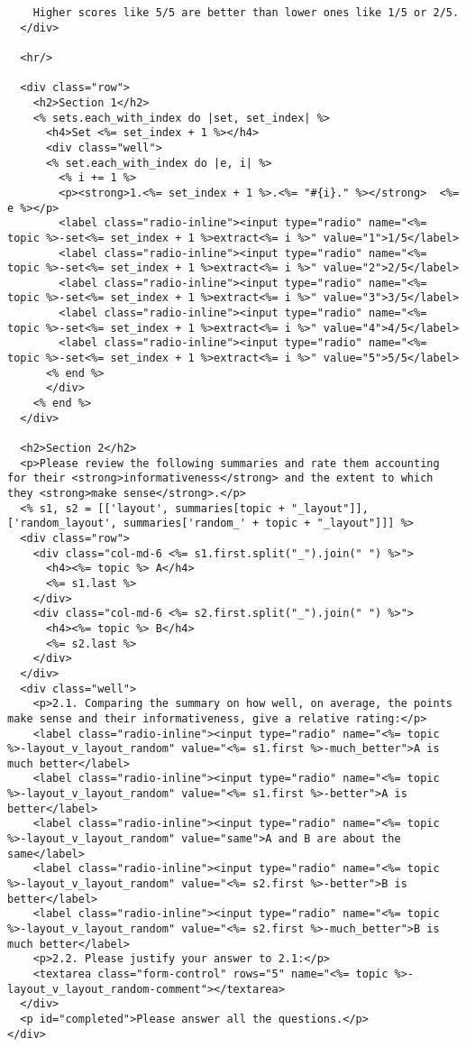 \documentclass{article}
\begin{document}
\begin{verbatim}
    Higher scores like 5/5 are better than lower ones like 1/5 or 2/5.
  </div>

  <hr/>

  <div class="row">
    <h2>Section 1</h2>
    <% sets.each_with_index do |set, set_index| %>
      <h4>Set <%= set_index + 1 %></h4>
      <div class="well">
      <% set.each_with_index do |e, i| %>
        <% i += 1 %>
        <p><strong>1.<%= set_index + 1 %>.<%= "#{i}." %></strong>  <%= e %></p>
        <label class="radio-inline"><input type="radio" name="<%= topic %>-set<%= set_index + 1 %>extract<%= i %>" value="1">1/5</label>
        <label class="radio-inline"><input type="radio" name="<%= topic %>-set<%= set_index + 1 %>extract<%= i %>" value="2">2/5</label>
        <label class="radio-inline"><input type="radio" name="<%= topic %>-set<%= set_index + 1 %>extract<%= i %>" value="3">3/5</label>
        <label class="radio-inline"><input type="radio" name="<%= topic %>-set<%= set_index + 1 %>extract<%= i %>" value="4">4/5</label>
        <label class="radio-inline"><input type="radio" name="<%= topic %>-set<%= set_index + 1 %>extract<%= i %>" value="5">5/5</label>
      <% end %>
      </div>
    <% end %>
  </div>

  <h2>Section 2</h2>
  <p>Please review the following summaries and rate them accounting for their <strong>informativeness</strong> and the extent to which they <strong>make sense</strong>.</p>
  <% s1, s2 = [['layout', summaries[topic + "_layout"]], ['random_layout', summaries['random_' + topic + "_layout"]]] %>
  <div class="row">
    <div class="col-md-6 <%= s1.first.split("_").join(" ") %>">
      <h4><%= topic %> A</h4>
      <%= s1.last %>
    </div>
    <div class="col-md-6 <%= s2.first.split("_").join(" ") %>">
      <h4><%= topic %> B</h4>
      <%= s2.last %>
    </div>
  </div>
  <div class="well">
    <p>2.1. Comparing the summary on how well, on average, the points make sense and their informativeness, give a relative rating:</p>
    <label class="radio-inline"><input type="radio" name="<%= topic %>-layout_v_layout_random" value="<%= s1.first %>-much_better">A is much better</label>
    <label class="radio-inline"><input type="radio" name="<%= topic %>-layout_v_layout_random" value="<%= s1.first %>-better">A is better</label>
    <label class="radio-inline"><input type="radio" name="<%= topic %>-layout_v_layout_random" value="same">A and B are about the same</label>
    <label class="radio-inline"><input type="radio" name="<%= topic %>-layout_v_layout_random" value="<%= s2.first %>-better">B is better</label>
    <label class="radio-inline"><input type="radio" name="<%= topic %>-layout_v_layout_random" value="<%= s2.first %>-much_better">B is much better</label>
    <p>2.2. Please justify your answer to 2.1:</p>
    <textarea class="form-control" rows="5" name="<%= topic %>-layout_v_layout_random-comment"></textarea>
  </div>
  <p id="completed">Please answer all the questions.</p>
</div>


\end{verbatim}
\pagebreak
\end{document}
